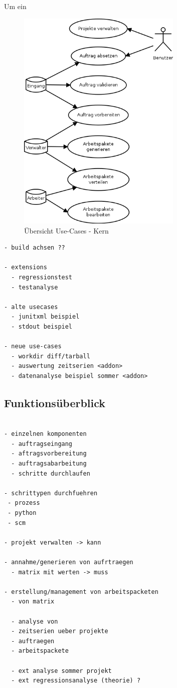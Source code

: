 Um ein
\begin{figure}[ht]
  \centering
  \label{fig:use-case-muss}
  \includegraphics[width=0.7\textwidth]{imageinput/use-case-muss.png}
  \caption{\"Ubersicht Use-Cases - Kern}
\end{figure}




\begin{verbatim}
- build achsen ??

- extensions
  - regressionstest
  - testanalyse

- alte usecases
  - junitxml beispiel
  - stdout beispiel

- neue use-cases
  - workdir diff/tarball
  - auswertung zeitserien <addon>
  - datenanalyse beispiel sommer <addon>
\end{verbatim}


\subsection{Funktions\"uberblick}



\begin{verbatim}

- einzelnen komponenten
  - auftragseingang
  - aftragsvorbereitung
  - auftragsabarbeitung
  - schritte durchlaufen

- schrittypen durchfuehren
 - prozess
 - python
 - scm

- projekt verwalten -> kann

- annahme/generieren von aufrtraegen
  - matrix mit werten -> muss

- erstellung/management von arbeitspacketen
  - von matrix

  - analyse von
  - zeitserien ueber projekte
  - auftraegen
  - arbeitspackete

  - ext analyse sommer projekt
  - ext regressionsanalyse (theorie) ?
\end{verbatim}

